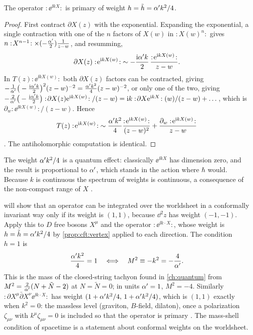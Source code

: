 \begin{proposition}[\TL]\label{prop:cft:vertex}
The operator $:\!\ee^{\ii kX}\!:$ is primary of weight
$h=\tilde h=\alpha' k^2/4$.
\end{proposition}
\begin{proof}
First contract $\partial X(z)$ with the exponential. Expanding the exponential, a single
contraction with one of the $n$ factors of $X(w)$ in $:\!X(w)^n\!:$ gives
$n:\!X^{n-1}\!:\times(-\frac{\alpha'}2)\frac{1}{z-w}$, and resumming,
\begin{equation}\label{eq:cft:dXexp}
  \partial X(z):\!\mathrm{e}^{\mathrm{i} kX(w)}\!:\;\sim-\frac{\mathrm{i}\alpha' k}{2}\,
  \frac{:\!\mathrm{e}^{\mathrm{i} kX(w)}\!:}{z-w}.
\end{equation}
In $T(z):\!\ee^{\ii kX(w)}\!:$ both $\partial X(z)$ factors can be contracted, giving
$-\frac1{\alpha'}\big(-\frac{\mathrm{i}\alpha' k}{2}\big)^2(z-w)^{-2}=\frac{\alpha' k^2}{4}(z-w)^{-2}$, or only one of
the two, giving $-\frac2{\alpha'}\big(-\frac{\mathrm{i}\alpha' k}2\big):\!\partial X(z)\mathrm{e}^{\mathrm{i} kX(w)}\!:/(z-w)
=\mathrm{i} k:\!\partial X\mathrm{e}^{\mathrm{i} kX}\!:(w)/(z-w)+\dots$, which is
$\partial_w:\!\ee^{\ii kX(w)}\!:/(z-w)$. Hence
\begin{equation}\label{eq:cft:Texp}
  T(z):\!\mathrm{e}^{\mathrm{i} kX(w)}\!:\;\sim\frac{\alpha' k^2}{4}\frac{:\!\mathrm{e}^{\mathrm{i} kX(w)}\!:}{(z-w)^2}
  +\frac{\partial_w:\!\mathrm{e}^{\mathrm{i} kX(w)}\!:}{z-w}
\end{equation}
. The antiholomorphic computation is identical.
\end{proof}

The weight $\alpha' k^2/4$ is a quantum effect: classically $\ee^{\ii kX}$ has dimension zero, and
the result is proportional to $\alpha'$, which stands in the action where $\hbar$ would. Because $k$ is continuous the
spectrum of weights is continuous, a consequence of the non-compact range of $X$
.

\begin{example}\label{ex:cft:tachyon}
 will show that an operator can be integrated over the worldsheet in a
conformally invariant way only if its weight is $(1,1)$, because $\dd^2z$ has weight $(-1,-1)$.
Apply this to $D$ free bosons $X^\mu$ and the operator $:\!\ee^{\ii k\cdot X}\!:$, whose weight
is $h=\tilde h=\alpha' k^2/4$ by \cref{prop:cft:vertex} applied to each direction. The condition
$h=1$ is
\[
   \frac{\alpha' k^2}{4}=1\quad\Longleftrightarrow\quad M^2\equiv-k^2=-\frac{4}{\alpha'}.
\]
This is the mass of the closed-string tachyon found in \cref{ch:quantum} from
$M^2=\frac{2}{\alpha'}(N+\tilde N-2)$ at $N=\tilde N=0$; in units $\alpha'=1$, $M^2=-4$. Similarly
$:\!\partial X^\mu\bar\partial X^\nu\ee^{\ii k\cdot X}\!:$ has weight
$(1+\alpha' k^2/4,\,1+\alpha' k^2/4)$, which is $(1,1)$ exactly when $k^2=0$: the massless level
(graviton, $B$-field, dilaton), once a polarization $\zeta_{\mu\nu}$ with
$k^\mu\zeta_{\mu\nu}=0$ is included so that the operator is primary
. The mass-shell condition of spacetime is a statement about
conformal weights on the worldsheet.
\end{example}

